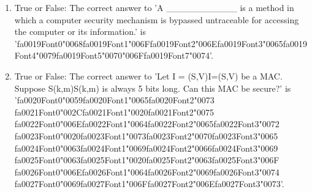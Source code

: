 \documentclass[12pt]{article}
\begin{document}
\begin{enumerate}[label=\arabic*.]
\item True or False: The correct answer to 'A \_\_\_\_\_\_\_\_\_\_\_ is a method in which a computer security mechanism is bypassed untraceable for accessing the computer or its information.' is '{\csname fa0019Font0\endcsname\char"0068}{\csname fa0019Font1\endcsname\char"006F}{\csname fa0019Font2\endcsname\char"006E}{\csname fa0019Font3\endcsname\char"0065}{\csname fa0019Font4\endcsname\char"0079}{\csname fa0019Font5\endcsname\char"0070}{\char"006F}{\csname fa0019Font7\endcsname\char"0074}'.
\item True or False: The correct answer to 'Let I = (S,V)I=(S,V) be a MAC. Suppose S(k,m)S(k,m) is always 5 bits long. Can this MAC be secure?' is '{\csname fa0020Font0\endcsname\char"0059}{\csname fa0020Font1\endcsname\char"0065}{\csname fa0020Font2\endcsname\char"0073} {\csname fa0021Font0\endcsname\char"002C}{\csname fa0021Font1\endcsname\char"0020}{\csname fa0021Font2\endcsname\char"0075} {\csname fa0022Font0\endcsname\char"006E}{\csname fa0022Font1\endcsname\char"0064}{\csname fa0022Font2\endcsname\char"0065}{\csname fa0022Font3\endcsname\char"0072} {\csname fa0023Font0\endcsname\char"0020}{\csname fa0023Font1\endcsname\char"0073}{\csname fa0023Font2\endcsname\char"0070}{\csname fa0023Font3\endcsname\char"0065} {\csname fa0024Font0\endcsname\char"0063}{\csname fa0024Font1\endcsname\char"0069}{\csname fa0024Font2\endcsname\char"0066}{\csname fa0024Font3\endcsname\char"0069} {\csname fa0025Font0\endcsname\char"0063}{\csname fa0025Font1\endcsname\char"0020}{\csname fa0025Font2\endcsname\char"0063}{\csname fa0025Font3\endcsname\char"006F} {\csname fa0026Font0\endcsname\char"006E}{\csname fa0026Font1\endcsname\char"0064}{\csname fa0026Font2\endcsname\char"0069}{\csname fa0026Font3\endcsname\char"0074} {\csname fa0027Font0\endcsname\char"0069}{\csname fa0027Font1\endcsname\char"006F}{\csname fa0027Font2\endcsname\char"006E}{\csname fa0027Font3\endcsname\char"0073}'.
\end{enumerate}
\end{document}
